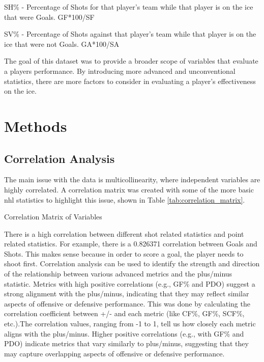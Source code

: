 \documentclass[12pt]{article}
\begin{document}
SH\% - Percentage of Shots for that player's team while that player is on the ice that were Goals. GF*100/SF

SV\% - Percentage of Shots against that player's team while that player is on the ice that were not Goals. GA*100/SA


The goal of this dataset was to provide a broader scope of variables that evaluate a players performance. By introducing more
advanced and unconventional statistics, there are more factors to consider in evaluating a player's effectiveness on the ice.


\section{Methods}
\label{sec:meth}

\subsection{Correlation Analysis}
The main issue with the data is multicollinearity, where independent variables are highly correlated. A correlation matrix was created 
with some of the more basic nhl statistics to highlight this issue, shown in Table \ref{tab:correlation_matrix}.

\begin{table}[h!]
  \centering
  \caption{Correlation Matrix of Variables}
  
  \label{tab:correlation_matrix}
\end{table}


There is a high correlation between different shot related statistics and point related statistics. For example, there is a 
0.826371 correlation between Goals and Shots. This makes sense because in order to score a goal, the player needs to shoot first.
Correlation analysis can be used to identify the strength and direction of the relationship between various advanced metrics and 
the plus/minus statistic. Metrics with high positive correlations (e.g., GF\% and PDO) suggest a strong alignment with the plus/minus, 
indicating that they may reflect similar aspects of offensive or defensive performance. This was done by calculating the correlation 
coefficient between +/- and each metric (like CF\%, GF\%, SCF\%, etc.).The correlation values, ranging from -1 to 1, tell us how closely 
each metric aligns with the plus/minus. Higher positive correlations (e.g., with GF\% and PDO) indicate metrics that vary similarly to 
plus/minus, suggesting that they may capture overlapping aspects of offensive or defensive performance.
\end{document}

